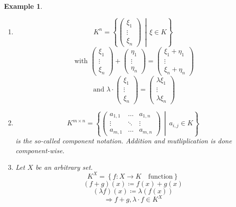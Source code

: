 \documentclass[a4paper,landscape,twocolumn]{article}
\newcommand\set[1]{\left\{#1\right\}}
\newcommand\setdef[2]{\left\{#1\,\middle|\,#2\right\}}
\newtheorem{ex}{Example}
\begin{document}
\begin{ex}
  \begin{enumerate}
    \item
      \[ K^n = \setdef{\begin{pmatrix} \xi_1 \\ \vdots \\ \xi_n \end{pmatrix}}{\xi \in K} \]
      \[
        \text{ with }
        \begin{pmatrix} \xi_1 \\ \vdots \\ \xi_n \end{pmatrix}
        + \begin{pmatrix} \eta_1 \\ \vdots \\ \eta_n \end{pmatrix}
        = \begin{pmatrix} \xi_1 + \eta_1 \\ \vdots \\ \xi_n + \eta_n \end{pmatrix}
      \] \[
        \text{ and }
        \lambda \cdot \begin{pmatrix} \xi_1 \\ \vdots \\ \xi_n \end{pmatrix}
        = \begin{pmatrix} \lambda \xi_1 \\ \vdots \\ \lambda \xi_n \end{pmatrix}
      \]

    \item
      \[
        K^{m\times n} = \setdef{
          \begin{pmatrix}
            a_{1,1} & \ldots & a_{1,n} \\
            \vdots & \ddots & \vdots \\
            a_{m,1} & \ldots & a_{m,n}
          \end{pmatrix}
        }{a_{i,j} \in K}
      \]
      is the so-called component notation. Addition and mutliplication is done
      component-wise.

    \item
      Let $X$ be an arbitrary set.
      \[ K^X = \set{f: X \rightarrow K \quad \text{function}} \]
      \[ (f + g)(x) \coloneqq f(x) + g(x) \]
      \[ (\lambda f)(x) \coloneqq \lambda (f(x)) \]
      \[ \Rightarrow f + g, \lambda \cdot f \in K^X \]
  \end{enumerate}
\end{ex}
\end{document}
